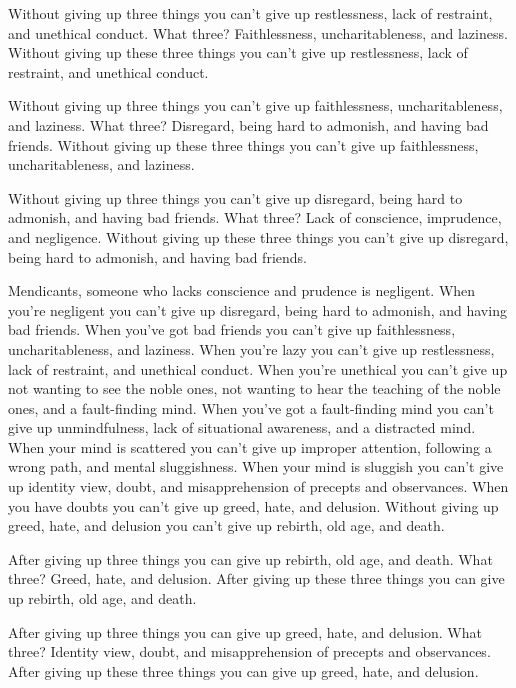 \documentclass[12pt,openany]{book}%
\begin{document}
Without giving up three things you can’t give up restlessness, lack of restraint, and unethical conduct. What three? Faithlessness, uncharitableness, and laziness. Without giving up these three things you can’t give up restlessness, lack of restraint, and unethical conduct. 

Without giving up three things you can’t give up faithlessness, uncharitableness, and laziness. What three? Disregard, being hard to admonish, and having bad friends. Without giving up these three things you can’t give up faithlessness, uncharitableness, and laziness. 

Without giving up three things you can’t give up disregard, being hard to admonish, and having bad friends. What three? Lack of conscience, imprudence, and negligence. Without giving up these three things you can’t give up disregard, being hard to admonish, and having bad friends. 

Mendicants, someone who lacks conscience and prudence is negligent. When you’re negligent you can’t give up disregard, being hard to admonish, and having bad friends. When you’ve got bad friends you can’t give up faithlessness, uncharitableness, and laziness. When you’re lazy you can’t give up restlessness, lack of restraint, and unethical conduct. When you’re unethical you can’t give up not wanting to see the noble ones, not wanting to hear the teaching of the noble ones, and a fault-finding mind. When you’ve got a fault-finding mind you can’t give up unmindfulness, lack of situational awareness, and a distracted mind. When your mind is scattered you can’t give up improper attention, following a wrong path, and mental sluggishness. When your mind is sluggish you can’t give up identity view, doubt, and misapprehension of precepts and observances. When you have doubts you can’t give up greed, hate, and delusion. Without giving up greed, hate, and delusion you can’t give up rebirth, old age, and death. 

After giving up three things you can give up rebirth, old age, and death. What three? Greed, hate, and delusion. After giving up these three things you can give up rebirth, old age, and death. 

After giving up three things you can give up greed, hate, and delusion. What three? Identity view, doubt, and misapprehension of precepts and observances. After giving up these three things you can give up greed, hate, and delusion. 
\end{document}
